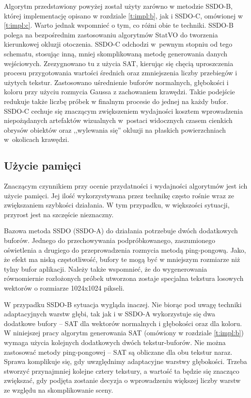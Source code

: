 		Algorytm przedstawiony powyżej został użyty zarówno w metodzie SSDO-B, której implementację opisano w rozdziale \ref{t:impl:b}, jak i SSDO-C, omówionej w \ref{t:impl:c}. Warto jednak wspomnieć o tym, co różni obie te techniki. SSDO-B polega na bezpośrednim zastosowaniu algorytmów StatVO do tworzenia kierunkowej okluzji otoczenia. SSDO-C odchodzi w~pewnym stopniu od tego schematu, stosując inną, mniej skomplikowaną metodę generowania danych wejściowych. Zrezygnowano tu z użycia SAT, kierując się chęcią uproszczenia procesu przygotowania wartości średnich oraz zmniejszenia liczby przebiegów i użytych tekstur. Zastosowano uśrednienie buforów normalnych, głębokości i koloru przy użyciu rozmycia Gaussa z zachowaniem krawędzi. Takie podejście redukuje także liczbę próbek w finalnym procesie do jednej na każdy bufor. SSDO-C cechuje się znaczącym zwiększeniem wydajności kosztem wprowadzenia niepożądanych artefaktów wizualnych w~postaci widocznych czasem cienkich obrysów obiektów oraz ,,wylewania się'' okluzji na płaskich powierzchniach w~okolicach krawędzi.
		
		\pagebreak
		
		\subsection{Użycie pamięci}
		\label{t:algorytm:stat:memory}
		
		Znaczącym czynnikiem przy ocenie przydatności i wydajności algorytmów jest ich użycie pamięci. Jej ilość wykorzystywana przez technikę często rośnie wraz ze zwiększaniem szybkości działania. W tym przypadku, w większości sytuacji, przyrost jest na szczęście nieznaczny. 
		
		Bazowa metoda SSDO (SSDO-A) do działania potrzebuje dwóch dodatkowych buforów. Jednego do przechowywania podpróbkowanego, zaszumionego oświetlenia a drugiego do przeprowadzenia rozmycia metodą ping-pongową. Jako, że efekt ma niską częstotliwość, bufory te mogą być w mniejszym rozmiarze niż tylny bufor aplikacji. Należy także wspomnieć, że do wygenerowania równomiernie rozłożonych próbek utworzona zostaje specjalna tekstura losowych wektorów o rozmiarze 1024x1024 pikseli. 
		
		W przypadku SSDO-B sytuacja wygląda inaczej. Nie biorąc pod uwagę techniki adaptacyjnych warstw głębi, tak jak i w SSDO-A wykorzystuje się dwa dodatkowe bufory -- SAT dla wektorów normalnych i głębokości oraz dla koloru. W niniejszej pracy algorytm generowania SAT (omówiony w rozdziale \ref{t:impl:b}) wymaga użycia kolejnych dodatkowych dwóch tekstur-buforów. Nie można zastosować metody ping-pongowej -- SAT są obliczane dla obu tekstur naraz. Sprawa komplikuje się, gdy uwzględnimy adaptacyjne warstwy głębokości. Trzeba stworzyć przynajmniej kolejne cztery tekstury, a wartość ta będzie się znacząco zwiększać, gdy podjęta zostanie decyzja o wprowadzeniu większej liczby warstw ze względu na skomplikowanie sceny.
		
